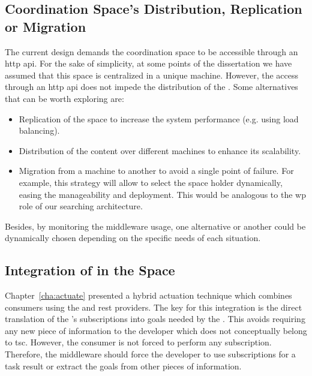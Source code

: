 \subsection{Coordination Space's Distribution, Replication or Migration} %

The current design demands the coordination space to be accessible through an \ac{http} \ac{api}.
For the sake of simplicity, at some points of the dissertation we have assumed that this space is centralized in a unique machine.
However, the access through an \ac{http} \ac{api} does not impede the distribution of the \coordspace{}.
Some alternatives that can be worth exploring are: %
\begin{itemize}
  \item Replication of the space to increase the system performance (e.g. using load balancing).
  \item Distribution of the content over different machines to enhance its scalability. %
  \item Migration from a machine to another to avoid a single point of failure.
        For example, this strategy will allow to select the space holder dynamically, easing the \coordspace{} manageability and deployment.
        This would be analogous to the \ac{wp} role of our searching architecture. %
\end{itemize}

Besides, by monitoring the middleware usage, one alternative or another could be dynamically chosen depending on the specific needs of each situation.


\subsection{Integration of \restActuation{} in the Space}

Chapter~\ref{cha:actuate} presented a hybrid actuation technique which combines consumers using the \spaceActuation{} and \ac{rest} providers.
The key for this integration is the direct translation of the \coordspace{}'s subscriptions into goals needed by the \restActuation{}.
This avoids requiring any new piece of information to the developer which does not conceptually belong to \ac{tsc}.
However, the consumer is not forced to perform any subscription.
Therefore, the middleware should force the developer to use subscriptions for a task result or extract the goals from other pieces of information.


